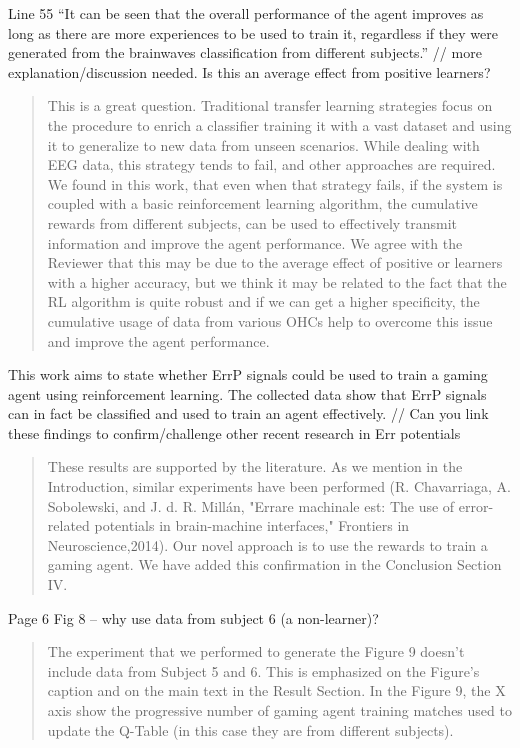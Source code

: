 \documentclass[journal,onecolumn,12pt]{IEEEtran}
\begin{document}
Line 55 “It can be seen that the overall performance of the agent improves as long as there are more experiences to be used to train it, regardless if they were generated from the brainwaves classification from different subjects.” // more explanation/discussion needed. Is this an average effect from positive learners?

\begin{quotation}
{\color{blue}
This is a great question.  Traditional transfer learning strategies focus on the procedure to enrich a classifier training it with a vast dataset and using it to generalize to new data from unseen scenarios.  While dealing with EEG data, this strategy tends to fail, and other approaches are required.  We found in this work, that even when that strategy fails, if the system is coupled with a basic reinforcement learning algorithm, the cumulative rewards from different subjects, can be used to effectively transmit information and improve the agent performance.  We agree with the Reviewer that this may be due to the average effect of positive or learners with a higher accuracy, but we think it may be related to the fact that the RL algorithm is quite robust and if we can get a higher specificity, the cumulative usage of data from various OHCs help to overcome this issue and improve the agent performance.
}
\end{quotation}

This work aims to state whether ErrP signals could be used to train a gaming agent using reinforcement learning. The collected data show that ErrP signals can in fact be classified and used to train an agent effectively. // Can you link these findings to confirm/challenge other recent research in Err potentials

\begin{quotation}
{\color{blue}

These results are supported by the literature. As we mention in the Introduction, similar experiments have been performed (R. Chavarriaga, A. Sobolewski, and J. d. R. Millán, "Errare machinale est: The use of error-related potentials in brain-machine interfaces," Frontiers in Neuroscience,2014).  Our novel approach is to use the rewards to train a gaming agent. 
We have added this confirmation in the Conclusion Section IV.
}
\end{quotation}

Page 6
Fig 8 – why use data from subject 6 (a non-learner)?

\begin{quotation}
{\color{blue}
The experiment that we performed to generate the Figure 9 doesn't include data from Subject 5 and 6. This is emphasized on the Figure's caption and on the main text in the Result Section.  In the Figure 9, the X axis show the progressive number of gaming agent training matches used to update the Q-Table (in this case they are from different subjects).
}
\end{quotation}
\end{document}

